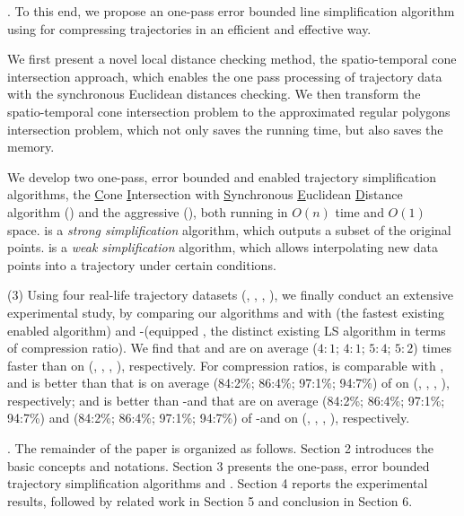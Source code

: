 .
To this end, we propose an one-pass error bounded line simplification algorithm using \sed for compressing trajectories in an efficient and effective way.

 We first present a novel local distance checking method, \ie the spatio-temporal cone intersection approach, which enables the one pass processing of trajectory data with the synchronous Euclidean distances checking. We then transform the spatio-temporal cone intersection problem to the approximated regular polygons intersection problem, which not only saves the running time, but also saves the memory.

 We develop two one-pass, error bounded and \sed enabled trajectory simplification algorithms, \ie the \underline{C}one \underline{I}ntersection with \underline{S}ynchronous \underline{E}uclidean \underline{D}istance algorithm (\cist) and the aggressive \cist (\cista), both running in $O(n)$ time and $O(1)$ space.
\cist is a \emph{strong simplification}\cite{Trajcevski:DDR} algorithm, which outputs a subset of the original points.
\cista is a \emph{weak simplification}\cite{Trajcevski:DDR} algorithm, which allows interpolating new data points into a trajectory under certain
conditions.


\stab (3) Using four real-life trajectory datasets (\truck, \sercar, \geolife, \pricar),
we finally conduct an extensive experimental study, by comparing our algorithms \cist and \cista with \squishe (the fastest existing \sed enabled \lsa algorithm) and \dpa-\sed (\sed equipped \dpa, the distinct existing LS algorithm in terms of compression ratio).
%
We find that \cist and \cista are on average ($4:1$; $4:1$; $5:4$; $5:2$) times faster than \squishe on (\truck, \sercar, \geolife, \pricar), respectively.
%
For compression ratios, \cist is comparable with \dpa, and is better than \squishe that is on average (84:2\%; 86:4\%; 97:1\%; 94:7\%) of \squishe on (\truck, \sercar, \geolife, \pricar), respectively; and \cista is better than \dpa-\sed and \squishe that are on average (84:2\%; 86:4\%; 97:1\%; 94:7\%) and (84:2\%; 86:4\%; 97:1\%; 94:7\%) of \dpa-\sed and \squishe on (\truck, \sercar, \geolife, \pricar), respectively.


.
The remainder of the paper is organized as follows.
Section 2 introduces the basic concepts and notations.
Section 3 presents the one-pass, error bounded trajectory simplification algorithms \cist and \cista.
Section 4 reports the experimental results, followed by related work in
Section 5 and conclusion in Section 6.






